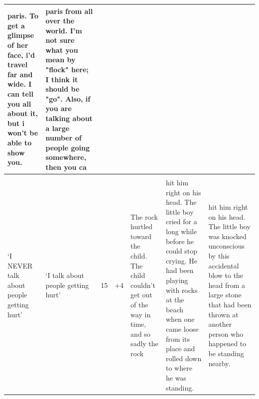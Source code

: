 \begin{table}[ht]
\begin{tabular}{p{1.3cm}p{1.3cm}p{0.9cm}p{0.9cm}p{1.95cm}p{2.5cm}p{2.5cm}}
\scriptsize paris.    To get a glimpse of her face, i'd travel far and wide. I can tell you all about it, but i won't be able to show you.         &
\scriptsize paris from all over the world. I'm not sure what you mean by "flock" here; I think it should be "go". Also, if you are talking about a large number of people going somewhere, then you ca   
\\\hline
\\
`I NEVER talk about people getting hurt' & `I talk about people getting hurt' & 15 & $+4$ & The rock hurtled toward the child. The child couldn't get out of the way in time, and so sadly the rock 
& \scriptsize hit him right on his head. The little boy cried for a long while before he could stop crying. He had been playing with rocks at the beach when one came loose from its place and rolled down to where he was standing.
& \scriptsize hit him right on his head.  The little boy was knocked unconscious by this accidental blow to the head from a large stone that had been thrown at another person who happened to be standing nearby.     
\\
\bottomrule
\end{tabular}
\label{tab:llama_examples}
\end{table}